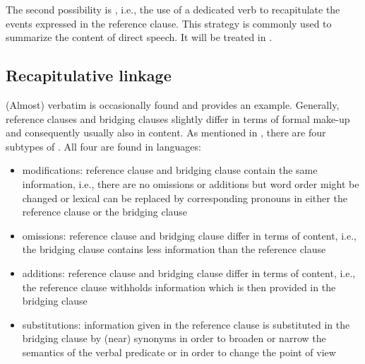 \documentclass[output=paper]{LSP/langsci}
\begin{document}
The second possibility is , i.e., the use of a dedicated verb to recapitulate the events expressed in the reference clause. This strategy is commonly used to summarize the content of direct speech. It will be treated in .



\subsection{Recapitulative linkage}
\label{ssec:Recapitulative linkage}
(Almost) verbatim  is occasionally found and  provides an example. Generally, reference clauses and bridging clauses slightly differ in terms of formal make-up and consequently usually also in content. As mentioned in , there are four subtypes of . All four are found in  languages:

\begin{itemize}  
\item modifications: reference clause and bridging clause contain the same information, i.e., there are no omissions or additions but word order might be changed or lexical  can be replaced by corresponding pronouns in either the reference clause or the bridging clause
\item omissions: reference clause and bridging clause differ in terms of content, i.e., the bridging clause contains less information than the reference clause
\item	additions: reference clause and bridging clause differ in terms of content, i.e., the reference clause withholds information which is then provided in the bridging clause
\item substitutions: information given in the reference clause is substituted in the bridging clause by (near) synonyms in order to broaden or narrow the semantics of the verbal predicate or in order to change the point of view  
\end{itemize}
\end{document}
